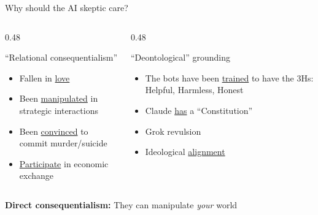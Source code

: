 \documentclass[aspectratio=1610, xcolor={dvipsnames}]{beamer}
\begin{document}
\begin{frame}{Why should the AI skeptic care?}
    \begin{minipage}{\linewidth}
        \begin{columns}[T,onlytextwidth]
            \begin{column}{0.48\textwidth}
                \begin{block}{\large ``Relational consequentialism''}
                    \begin{itemize}
                        \item Fallen in \href{https://replika.com/}{love}
                        \item Been \href{https://ai.meta.com/research/cicero/diplomacy/}{manipulated} in strategic interactions
                        \item Been \href{https://www.wsj.com/tech/ai/chatgpt-ai-stein-erik-soelberg-murder-suicide-6b67dbfb}{convinced} to commit murder/suicide
                        \item \href{https://www.anthropic.com/research/project-vend-1}{Participate} in economic exchange
                    \end{itemize}
                \end{block}
            \end{column}
            \begin{column}{0.48\textwidth}
                \begin{block}{\large ``Deontological'' grounding}
                    \begin{itemize}
                        \item The bots have been \href{https://arxiv.org/html/2112.00861v3}{trained} to have the 3Hs: Helpful, Harmless, Honest
                        \item Claude \href{https://www.anthropic.com/constitution}{has} a ``Constitution''
                        \item Grok revulsion
                        \item Ideological \href{https://www.economist.com/briefing/2026/06/25/ai-models-values-are-very-different-from-most-peoples}{alignment}
                    \end{itemize}
                \end{block}
            \end{column}
        \end{columns}
    \end{minipage}

    \vspace{2em}

    \textbf{Direct consequentialism:} They can manipulate \textit{your} world

\end{frame}
\end{document}
